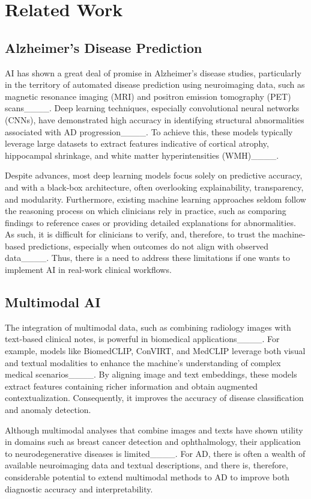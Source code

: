 \section{Related Work}
\subsection{Alzheimer's Disease Prediction}
AI has shown a great deal of promise in Alzheimer's disease studies, particularly in the territory of automated disease prediction using neuroimaging data, such as magnetic resonance imaging (MRI) and positron emission tomography (PET) scans____. Deep learning techniques, especially convolutional neural networks (CNNs), have demonstrated high accuracy in identifying structural abnormalities associated with AD progression____. To achieve this, these models typically leverage large datasets to extract features indicative of cortical atrophy, hippocampal shrinkage, and white matter hyperintensities (WMH)____.

Despite advances, most deep learning models focus solely on predictive accuracy, and with a black-box architecture, often overlooking explainability, transparency, and modularity.
Furthermore, existing machine learning approaches seldom follow the reasoning process on which clinicians rely in practice, such as comparing findings to reference cases or providing detailed explanations for abnormalities. 
As such, it is difficult for clinicians to verify, and, therefore, to trust the machine-based predictions, especially when outcomes do not align with observed data____. Thus, there is a need to address these limitations if one wants to implement AI in real-work clinical workflows.

\subsection{Multimodal AI}
The integration of multimodal data, such as combining radiology images with text-based clinical notes, is powerful in biomedical applications____. For example, models like BiomedCLIP, ConVIRT, and MedCLIP leverage both visual and textual modalities to enhance the machine's understanding of complex medical scenarios____. By aligning image and text embeddings, these models extract features containing richer information and obtain augmented contextualization. Consequently, it improves the accuracy of disease classification and anomaly detection.

Although multimodal analyses that combine images and texts have shown utility in domains such as breast cancer detection and ophthalmology, their application to neurodegenerative diseases is limited____. For AD, there is often a wealth of available neuroimaging data and textual descriptions, and there is, therefore, considerable potential to extend multimodal methods to AD to improve both diagnostic accuracy and interpretability.

